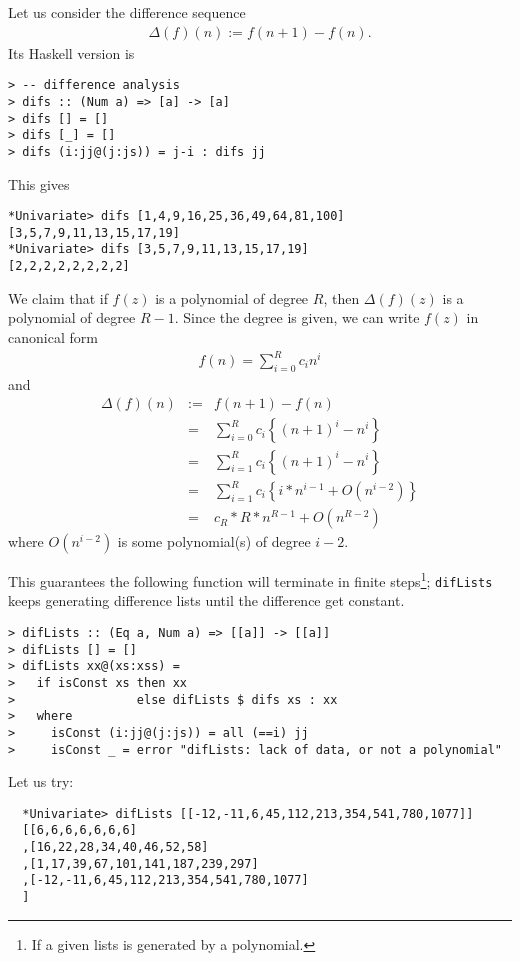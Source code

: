 \documentclass[11pt]{book}
\begin{document}
Let us consider the difference sequence
\begin{eqnarray}
\label{difference}
\Delta(f) (n) := f(n+1) - f(n).
\end{eqnarray}
Its Haskell version is
\begin{verbatim}
> -- difference analysis
> difs :: (Num a) => [a] -> [a]
> difs [] = []
> difs [_] = []
> difs (i:jj@(j:js)) = j-i : difs jj
\end{verbatim}
This gives
\begin{verbatim}
*Univariate> difs [1,4,9,16,25,36,49,64,81,100]
[3,5,7,9,11,13,15,17,19]
*Univariate> difs [3,5,7,9,11,13,15,17,19]
[2,2,2,2,2,2,2,2]
\end{verbatim}

We claim that if $f(z)$ is a polynomial of degree $R$, then $\Delta(f)(z)$ is a polynomial of degree $R-1$.
Since the degree is given, we can write $f(z)$ in canonical form
\begin{eqnarray}
f(n) = \sum_{i=0}^R c_i n^i
\end{eqnarray}
and
\begin{eqnarray}
\Delta(f)(n) &:=& f(n+1) - f(n) \\
&=& \sum_{i=0}^R c_i \left\{ (n+1)^i - n^i\right\} \\
&=& \sum_{i=1}^R c_i \left\{ (n+1)^i - n^i\right\} \\
&=& \sum_{i=1}^R c_i \left\{ i*n^{i-1} + O(n^{i-2}) \right\} \\
&=& c_R*R*n^{R-1} + O(n^{R-2})
\end{eqnarray}
where $O(n^{i-2})$ is some polynomial(s) of degree $i-2$.

This guarantees the following function will terminate in finite steps\footnote{
If a given lists is generated by a polynomial.
}; \texttt{difLists} keeps generating difference lists until the difference get constant.
\begin{verbatim}
> difLists :: (Eq a, Num a) => [[a]] -> [[a]]
> difLists [] = []
> difLists xx@(xs:xss) =
>   if isConst xs then xx
>                 else difLists $ difs xs : xx
>   where
>     isConst (i:jj@(j:js)) = all (==i) jj
>     isConst _ = error "difLists: lack of data, or not a polynomial"
\end{verbatim}
Let us try:
\begin{verbatim}
  *Univariate> difLists [[-12,-11,6,45,112,213,354,541,780,1077]]
  [[6,6,6,6,6,6,6]
  ,[16,22,28,34,40,46,52,58]
  ,[1,17,39,67,101,141,187,239,297]
  ,[-12,-11,6,45,112,213,354,541,780,1077]
  ]
\end{verbatim}
\end{document}
